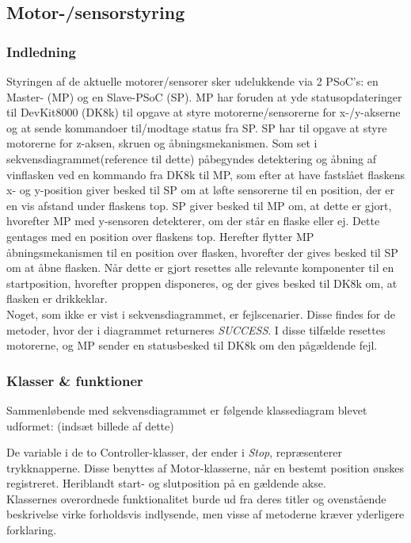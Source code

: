 \subsection{Motor-/sensorstyring}

\subsubsection{Indledning}
Styringen af de aktuelle motorer/sensorer sker udelukkende via 2 PSoC's: en Master- (MP) og en Slave-PSoC (SP). MP har foruden at yde statusopdateringer til DevKit8000 (DK8k) til opgave at styre motorerne/sensorerne for x-/y-akserne og at sende kommandoer til/modtage status fra SP. SP har til opgave at styre motorerne for z-aksen, skruen og åbningsmekanismen. Som set i sekvensdiagrammet(reference til dette) påbegyndes detektering og åbning af vinflasken ved en kommando fra DK8k til MP, som efter at have fastslået flaskens x- og y-position giver besked til SP om at løfte sensorerne til en position, der er en vis afstand under flaskens top. SP giver besked til MP om, at dette er gjort, hvorefter MP med y-sensoren detekterer, om der står en flaske eller ej. Dette gentages med en position over flaskens top. Herefter flytter MP åbningsmekanismen til en position over flasken, hvorefter der gives besked til SP om at åbne flasken. Når dette er gjort resettes alle relevante komponenter til en startposition, hvorefter proppen disponeres, og der gives besked til DK8k om, at flasken er drikkeklar. \\
Noget, som ikke er vist i sekvensdiagrammet, er fejlscenarier. Disse findes for de metoder, hvor der i diagrammet returneres \textit{SUCCESS}. I disse tilfælde resettes motorerne, og MP sender en statusbesked til DK8k om den pågældende fejl. \\

\subsubsection{Klasser & funktioner}
Sammenløbende med sekvensdiagrammet er følgende klassediagram blevet udformet: (indsæt billede af dette)

De variable i de to Controller-klasser, der ender i \textit{Stop}, repræsenterer trykknapperne. Disse benyttes af Motor-klasserne, når en bestemt position ønskes registreret. Heriblandt start- og slutposition på en gældende akse. \\
Klassernes overordnede funktionalitet burde ud fra deres titler og ovenstående beskrivelse virke forholdsvis indlysende, men visse af metoderne kræver yderligere forklaring.

